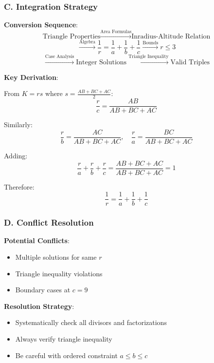 \documentclass[12pt]{article}
\begin{document}
\begin{techniquesbox}
\subsubsection*{C. Integration Strategy}

\textbf{Conversion Sequence}:
$$\text{Triangle Properties} \xrightarrow{\text{Area Formulas}} \text{Inradius-Altitude Relation}$$
$$\xrightarrow{\text{Algebra}} \frac{1}{r} = \frac{1}{a} + \frac{1}{b} + \frac{1}{c} \xrightarrow{\text{Bounds}} r \leq 3$$
$$\xrightarrow{\text{Case Analysis}} \text{Integer Solutions} \xrightarrow{\text{Triangle Inequality}} \text{Valid Triples}$$

\textbf{Key Derivation}:

From $K = rs$ where $s = \frac{AB + BC + AC}{2}$:
$$\frac{r}{c} = \frac{AB}{AB + BC + AC}$$

Similarly:
$$\frac{r}{b} = \frac{AC}{AB + BC + AC}, \quad \frac{r}{a} = \frac{BC}{AB + BC + AC}$$

Adding:
$$\frac{r}{a} + \frac{r}{b} + \frac{r}{c} = \frac{AB + BC + AC}{AB + BC + AC} = 1$$

Therefore:
$$\boxed{\frac{1}{r} = \frac{1}{a} + \frac{1}{b} + \frac{1}{c}}$$

\subsubsection*{D. Conflict Resolution}

\textbf{Potential Conflicts}:
\begin{itemize}
    \item Multiple solutions for same $r$
    \item Triangle inequality violations
    \item Boundary cases at $c = 9$
\end{itemize}

\textbf{Resolution Strategy}:
\begin{itemize}
    \item Systematically check all divisors and factorizations
    \item Always verify triangle inequality
    \item Be careful with ordered constraint $a \leq b \leq c$
\end{itemize}

\end{techniquesbox}
\end{document}
